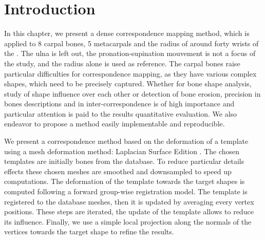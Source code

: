 \section{Introduction}
\label{sec:4_Introduction}



In this chapter, we present a dense correspondence mapping method, which is applied to 8 carpal bones, 5 metacarpals and the radius of around forty wrists of the \db*. The ulna is left out, the pronation-supination mouvement is not a focus of the study, and the radius alone is used as reference. The carpal bones raise particular difficulties for correspondence mapping, as they have various complex shapes, which need to be precisely captured. Whether for bone shape analysis, study of shape influence over each other or detection of bone erosion, precision in bones descriptions and in inter-correspondence is of high importance and particular attention is paid to the results quantitative evaluation. 
We also endeavor to propose a method easily implementable and reproducible. 

We present a correspondence method based on the deformation of a template using a mesh deformation method: Laplacian Surface Edition \cite{sorkine_2004_laplacian}. The chosen templates are initially bones from the database. To reduce particular details effects these chosen meshes are smoothed and downsampled to speed up computations. The deformation of the template towards the target shapes is computed following a forward group-wise registration model. The template is registered to the database meshes, then it is updated by averaging every vertex positions. These steps are iterated, the update of the template allows to reduce its influence. Finally, we use a simple local projection along the normals of the vertices towards the target shape to refine the results. 



